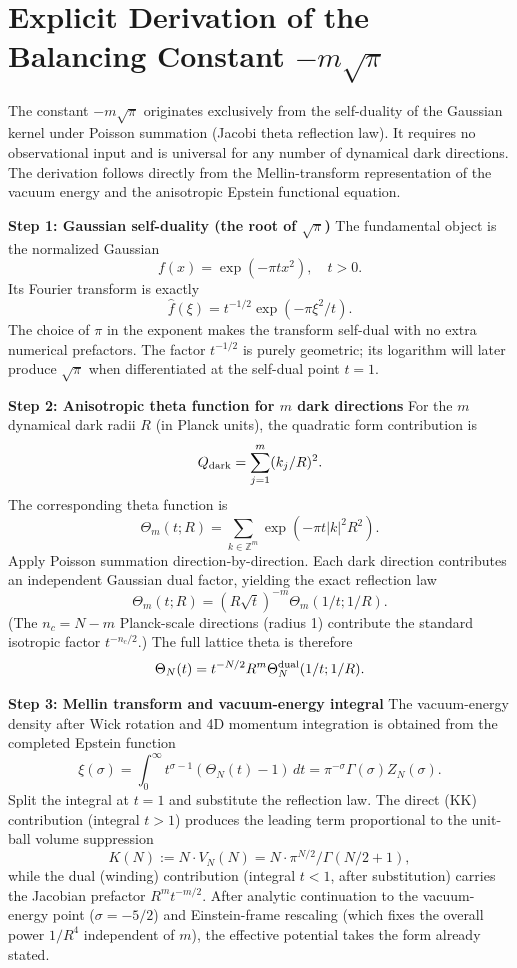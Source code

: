 \documentclass[12pt,a4paper]{article}
\begin{document}
\section{Explicit Derivation of the Balancing Constant \(-m\sqrt{\pi}\)}
The constant \(-m\sqrt{\pi}\) originates exclusively from the self-duality of the Gaussian kernel under Poisson summation (Jacobi theta reflection law). It requires no observational input and is universal for any number of dynamical dark directions. The derivation follows directly from the Mellin-transform representation of the vacuum energy and the anisotropic Epstein functional equation.

\textbf{Step 1: Gaussian self-duality (the root of \(\sqrt{\pi}\))}  
The fundamental object is the normalized Gaussian
\[
f(x) = \exp(-\pi t x^2),\quad t > 0.
\]
Its Fourier transform is exactly
\[
\hat{f}(\xi) = t^{-1/2} \exp(-\pi \xi^2 / t).
\]
The choice of \(\pi\) in the exponent makes the transform self-dual with no extra numerical prefactors. The factor \(t^{-1/2}\) is purely geometric; its logarithm will later produce \(\sqrt{\pi}\) when differentiated at the self-dual point \(t=1\).

\textbf{Step 2: Anisotropic theta function for \(m\) dark directions}  
For the \(m\) dynamical dark radii \(R\) (in Planck units), the quadratic form contribution is
\[
Q_{\rm dark} = \sum_{j=1}^m (k_j / R)^2.
\]
The corresponding theta function is
\[
\Theta_m(t;R) = \sum_{k\in\mathbb{Z}^m} \exp(-\pi t |k|^2 R^2).
\]
Apply Poisson summation direction-by-direction. Each dark direction contributes an independent Gaussian dual factor, yielding the exact reflection law
\[
\Theta_m(t;R) = (R \sqrt{t})^{-m} \Theta_m(1/t; 1/R).
\]
(The \(n_c = N-m\) Planck-scale directions (radius 1) contribute the standard isotropic factor \(t^{-n_c/2}\).) The full lattice theta is therefore
\[
\Theta_N(t) = t^{-N/2} R^m \Theta_N^{\rm dual}(1/t; 1/R).
\]

\textbf{Step 3: Mellin transform and vacuum-energy integral}  
The vacuum-energy density after Wick rotation and 4D momentum integration is obtained from the completed Epstein function
\[
\xi(\sigma) = \int_0^\infty t^{\sigma-1} (\Theta_N(t)-1)\, dt = \pi^{-\sigma} \Gamma(\sigma) Z_N(\sigma).
\]
Split the integral at \(t=1\) and substitute the reflection law. The direct (KK) contribution (integral \(t>1\)) produces the leading term proportional to the unit-ball volume suppression
\[
K(N) := N \cdot V_N(N) = N \cdot \pi^{N/2}/\Gamma(N/2+1),
\]
while the dual (winding) contribution (integral \(t<1\), after substitution) carries the Jacobian prefactor \(R^m t^{-m/2}\). After analytic continuation to the vacuum-energy point (\(\sigma = -5/2\)) and Einstein-frame rescaling (which fixes the overall power \(1/R^4\) independent of \(m\)), the effective potential takes the form already stated.
\end{document}
